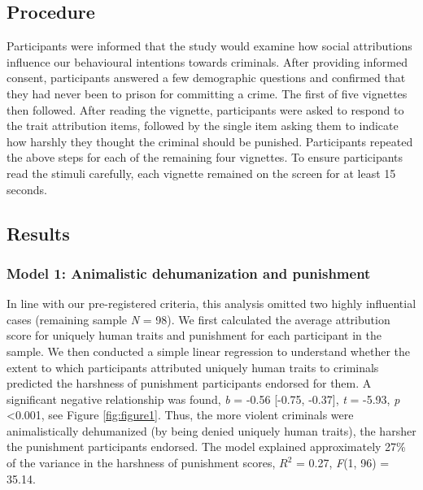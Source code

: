 \documentclass[
]{article}
\begin{document}
\hypertarget{procedure}{%
\subsection{Procedure}\label{procedure}}

Participants were informed that the study would examine how social attributions influence our behavioural intentions towards criminals. After providing informed consent, participants answered a few demographic questions and confirmed that they had never been to prison for committing a crime. The first of five vignettes then followed. After reading the vignette, participants were asked to respond to the trait attribution items, followed by the single item asking them to indicate how harshly they thought the criminal should be punished. Participants repeated the above steps for each of the remaining four vignettes. To ensure participants read the stimuli carefully, each vignette remained on the screen for at least 15 seconds.

\hypertarget{results}{%
\subsection{Results}\label{results}}

\hypertarget{model-1-animalistic-dehumanization-and-punishment}{%
\subsubsection{Model 1: Animalistic dehumanization and punishment}\label{model-1-animalistic-dehumanization-and-punishment}}

In line with our pre-registered criteria, this analysis omitted two highly influential cases (remaining sample \emph{N} = 98). We first calculated the average attribution score for uniquely human traits and punishment for each participant in the sample. We then conducted a simple linear regression to understand whether the extent to which participants attributed uniquely human traits to criminals predicted the harshness of punishment participants endorsed for them. A significant negative relationship was found, \emph{b} = -0.56 {[}-0.75, -0.37{]}, \emph{t} = -5.93, \emph{p} \textless0.001, see Figure \ref{fig:figure1}. Thus, the more violent criminals were animalistically dehumanized (by being denied uniquely human traits), the harsher the punishment participants endorsed. The model explained approximately 27\% of the variance in the harshness of punishment scores, \(R^2\) = 0.27, \emph{F}(1, 96) = 35.14.
\end{document}
